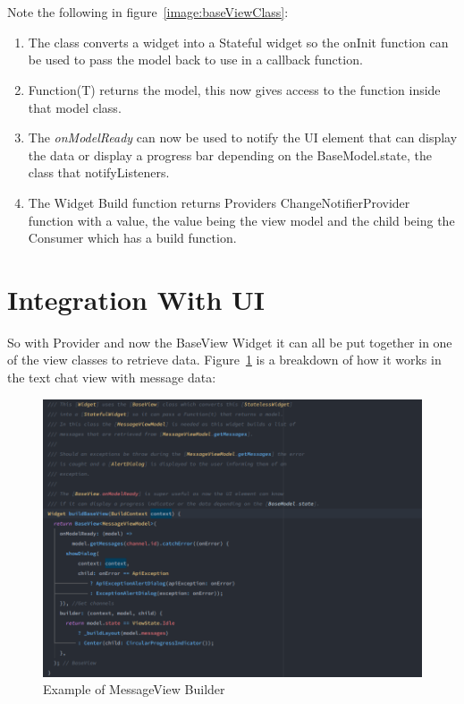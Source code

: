\\\\Note the following in figure~\ref{image:baseViewClass}:
\begin{enumerate}
	\item The class converts a widget into a Stateful widget so the onInit function can be used to pass the model back to use in a callback function.
	\item Function(T) returns the model, this now gives access to the function inside that model class.
	\item The \textit{onModelReady} can now be used to notify the UI element that can display the data or display a progress bar depending on the BaseModel.state, the class that notifyListeners.
	\item The Widget Build function returns Providers ChangeNotifierProvider function with a value, the value being the view model and the child being the Consumer which has a build function. 
\end{enumerate}

\section{Integration With UI}
So with Provider and now the BaseView Widget it can all be put together in one of the view classes to retrieve data. Figure~\ref{image:messageViewBuilder} is a breakdown of how it works in the text chat view with message data:

\begin{figure}[h!]
    \caption{Example of MessageView Builder}
    \label{image:messageViewBuilder}
    \centering
    \includegraphics[width=1.0\textwidth]{images/messge_view_builder_with_model.png}
\end{figure}

